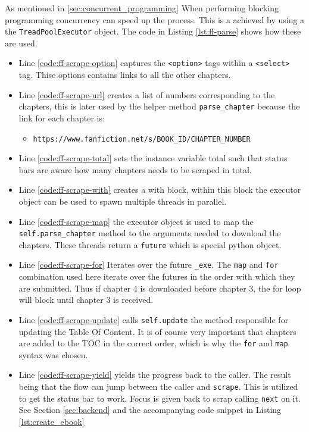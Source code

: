 \documentclass[]{report}   %
\begin{document}
As mentioned in \ref{sec:concurrent_programming} When performing blocking
programming concurrency can speed up the process. This is a achieved by using a
the \texttt{TreadPoolExecutor} object. The code in Listing \ref{lst:ff-parse} shows how these are used.
\begin{itemize}
	\item Line \ref{code:ff-scrape-option} captures the \texttt{<option>} tags within a \texttt{<select>} tag. Thise options contains links to all the other chapters.
	\item Line \ref{code:ff-scrape-url} creates a list of numbers corresponding to the chapters, this is later used by the helper method \texttt{parse\_chapter} because the link for each chapter is:
		\begin{itemize}
			\item \texttt{https://www.fanfiction.net/s/BOOK\_ID/CHAPTER\_NUMBER}
		\end{itemize}
	\item Line \ref{code:ff-scrape-total} sets the instance variable total such that status bars are aware how many chapters needs to be scraped in total.
	\item Line \ref{code:ff-scrape-with} creates a with block, within this
		block the executor object can be used to spawn multiple threads in
		parallel. 
	\item Line \ref{code:ff-scrape-map} the executor object is used to map the
		\texttt{self.parse\_chapter} method to the arguments needed to download
		the chapters. These threads return a \texttt{future} which is
		special python object. 
	\item Line \ref{code:ff-scrape-for} Iterates over the future
		\texttt{\_exe}. The \texttt{map} and \texttt{for} combination used here
		iterate over the futures in the order with which they are submitted.
		Thus if chapter 4 is downloaded before chapter 3, the for loop will
		block until chapter 3 is received. 
	\item Line \ref{code:ff-scrape-update} calls \texttt{self.update} the
		method responsible for updating the Table Of Content. It is of course
		very important that chapters are added to the TOC in the correct order,
		which is why the \texttt{for} and \texttt{map} syntax was chosen.
	\item Line \ref{code:ff-scrape-yield} yields the progress back to the
		caller. The result being that the flow can jump between the caller and
		\texttt{scrape}.  This is utilized to get the status bar to work. Focus
		is given back to scrap calling \texttt{next} on it. See Section
		\ref{sec:backend} and the accompanying code snippet in Listing
		\ref{lst:create_ebook} 
\end{itemize}
\end{document}
